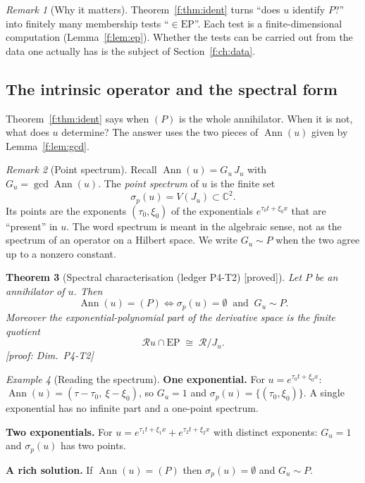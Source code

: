 \documentclass[11pt]{article}
\theoremstyle{plain}
\newtheorem{theorem}{Theorem}[section]
\theoremstyle{definition}
\theoremstyle{remark}
\newtheorem{remark}[theorem]{Remark}
\newtheorem{example}[theorem]{Example}
\newcommand{\C}{\mathbb{C}}
\newcommand{\ring}{\mathcal{R}}            %
\DeclareMathOperator{\Ann}{Ann}             %
\newcommand{\Var}{V}                        %
\newcommand{\EP}{\mathrm{EP}}               %
\DeclareMathOperator{\Gcd}{gcd}
\newcommand{\badge}[2]{\textcolor{#1}{\textsf{\footnotesize[#2]}}}
\newcommand{\proved}[1][]{\badge{cC}{proved#1}}
\newcommand{\led}[1]{\textcolor{cG}{\textsf{\footnotesize(ledger #1)}}}
\newenvironment{takeaway}{\begin{remark}[Why it matters]}{\end{remark}}
\newenvironment{notebox}[1]{\begin{remark}[#1]}{\end{remark}}
\newcommand{\dimref}[1]{\textsf{\footnotesize[proof: Dim.~#1]}}
\begin{document}
\begin{takeaway}
Theorem~\ref{f:thm:ident} turns ``does $u$ identify $P$?'' into finitely many membership tests ``$\in\EP$''. Each test is a finite-dimensional computation (Lemma~\ref{f:lem:ep}). Whether the tests can be carried out from the data one actually has is the subject of Section~\ref{f:ch:data}.
\end{takeaway}

\subsection{The intrinsic operator and the spectral form}\label{sec:spectral}

Theorem~\ref{f:thm:ident} says when $(P)$ is the whole annihilator. When it is not, what does $u$ determine? The answer uses the two pieces of $\Ann(u)$ given by Lemma~\ref{f:lem:gcd}.

\begin{notebox}{Point spectrum}
Recall $\Ann(u)=G_u\,J_u$ with $G_u=\Gcd\Ann(u)$. The \emph{point spectrum} of $u$ is the finite set
\[
\sigma_p(u)=\Var(J_u)\subset\C^2 .
\]
Its points are the exponents $(\tau_0,\xi_0)$ of the exponentials $e^{\tau_0t+\xi_0x}$ that are ``present'' in $u$. The word spectrum is meant in the algebraic sense, not as the spectrum of an operator on a Hilbert space. We write $G_u\sim P$ when the two agree up to a nonzero constant.
\end{notebox}

\begin{theorem}[{Spectral characterisation \led{P4-T2} \proved}]\label{thm:spec}
Let $P$ be an annihilator of $u$. Then
\[
\Ann(u)=(P)\iff \sigma_p(u)=\emptyset\ \text{ and }\ G_u\sim P .
\]
Moreover the exponential-polynomial part of the derivative space is the finite quotient
\[
\ring u\cap\EP\;\cong\;\ring/J_u .
\]
\dimref{P4-T2}
\end{theorem}

\begin{example}[{Reading the spectrum}]
\textbf{One exponential.} For $u=e^{\tau_0t+\xi_0x}$: $\Ann(u)=(\tau-\tau_0,\ \xi-\xi_0)$, so $G_u=1$ and $\sigma_p(u)=\{(\tau_0,\xi_0)\}$. A single exponential has no infinite part and a one-point spectrum.

\textbf{Two exponentials.} For $u=e^{\tau_1t+\xi_1x}+e^{\tau_2t+\xi_2x}$ with distinct exponents: $G_u=1$ and $\sigma_p(u)$ has two points.

\textbf{A rich solution.} If $\Ann(u)=(P)$ then $\sigma_p(u)=\emptyset$ and $G_u\sim P$.
\end{example}
\end{document}
